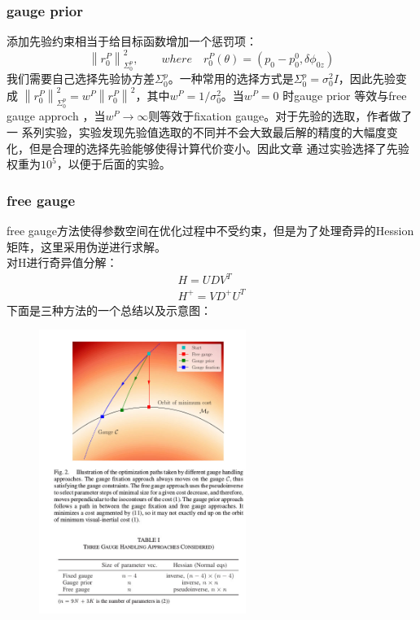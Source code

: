 \documentclass[UTF8]{ctexart}
\begin{document}
\subsubsection{gauge prior}
\indent 添加先验约束相当于给目标函数增加一个惩罚项：
\begin{equation}
\left\|r_0^P\right\|^2_{\Sigma_0^p},\qquad where\quad r_0^P(\theta) = (p_0-p_0^0,\delta\phi_{0z})
\end{equation}
\indent 我们需要自己选择先验协方差$\Sigma_0^p$。一种常用的选择方式是$\Sigma_0^p = \sigma_0^2I$，因此先验变成
$\left\|r_0^P\right\|^2_{\Sigma_0^p} = w^P\left\|r_0^P\right\|^2$，其中$w^P=1/\sigma_0^2$。当$w^P=0$
时gauge prior 等效与free gauge approch ，当$w^P\to \infty$则等效于fixation gauge。对于先验的选取，作者做了一
系列实验，实验发现先验值选取的不同并不会大致最后解的精度的大幅度变化，但是合理的选择先验能够使得计算代价变小。因此文章
通过实验选择了先验权重为$10^5$，以便于后面的实验。
\subsubsection{free gauge}
\indent free gauge方法使得参数空间在优化过程中不受约束，但是为了处理奇异的Hession矩阵，这里采用伪逆进行求解。\\
\indent 对H进行奇异值分解：\\
\begin{equation}
\begin{aligned}
H = UDV^T \\
H^+ = VD^+U^T
\end{aligned}
\end{equation}
\indent 下面是三种方法的一个总结以及示意图：
\begin{figure}[H]
\centering
\includegraphics[width=0.6\textwidth]{2.1.jpg}    
\label{img0}
\end{figure}
\end{document}
